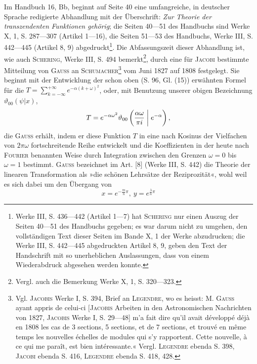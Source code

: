 \par
Im Handbuch 16, Bb, beginnt auf Seite 40 eine umfangreiche, in deutscher
Sprache redigierte Abhandlung mit der Überschrift: \textit{Zur Theorie der
transzendenten Funktionen gehörig}; die Seiten 40—51 des Handbuchs sind Werke
X, 1, S. 287—307 (Artikel 1—16), die Seiten 51—53 des Handbuchs, Werke
III, S. 442—445 (Artikel 8, 9) abgedruckt\footnote{Werke III, S. 436—442 (Artikel 1—7) hat \textsc{Schering} nur einen Auszug der Seiten 40—51 des Handbuchs gegeben; es war darum nicht zu umgehen, den vollständigen Text dieser Seiten im Bande X, 1 der Werke abzudrucken; die Werke III, S. 442—445 abgedruckten Artikel 8, 9, geben den Text der Handschrift mit so unerheblichen Auslassungen, dass von einem Wiederabdruck abgesehen werden konnte.}. Die Abfassungszeit dieser Abhandlung
ist, wie auch \textsc{Schering}, Werke III, S. 494 bemerkt\footnote{Vergl. auch die Bemerkung Werke X, 1, S. 320—323.}, durch eine
für \textsc{Jacobi} bestimmte Mitteilung von \textsc{Gauss} an \textsc{Schumacher}\footnote{Vgl. \textsc{Jacobis} Werke I, S. 394, Brief an \textsc{Legendre}, wo es heisst: M. \textsc{Gauss} ayant appris de celui-ci [\textsc{Jacobis} Arbeiten in den Astronomischen Nachrichten von 1827, \textsc{Jacobis} Werke I, S. 29—48] m’a fait dire qu’il avait développé déjà en 1808 les cas de 3 sections, 5 sections, et de 7 sections, et trouvé en même temps les nouvelles échelles de modules qui s’y rapportent. Cette nouvelle, à ce qui me paraît, est bien intéressante.« Vergl. \textsc{Legendre} ebenda S. 398, \textsc{Jacobi} ebenda S. 416, \textsc{Legendre} ebenda S. 418, 428.} vom Juni 1827
auf 1808 festgelegt. Sie beginnt mit der Entwicklung der schon oben (S. 96,
Gl. (15)) erwähnten Formel für die  \(\displaystyle T=\sum_{k=-\infty}^{+\infty}e^{-\alpha(k+\omega)^2}\),
oder, mit Benutzung unserer obigen Bezeichnung \(\vartheta_{00}(\psi|x)\),
\[
T=e^{-\alpha\omega^2}\vartheta_{00}\left(\frac{\alpha\omega}{\pi i}\biggm|e^{-\alpha}\right),
\]
die \textsc{Gauss} erhält, indem er diese Funktion \(T\) in eine nach Kosinus der Vielfachen
von \(2\pi\omega\) fortschreitende Reihe entwickelt und die Koeffizienten in
der heute nach \textsc{Fourier} benannten Weise durch Integration zwischen den
Grenzen \(\omega=0\) bis \(\omega=1\) bestimmt. \textsc{Gauss} bezeichnet im Art. [8] (Werke
III, S. 442) die Theorie der linearen Transformation als »die schönen Lehrsätze
der Reziprozität«, wohl weil es sich dabei um den Übergang von
\[
x=e^{-\frac{m}{n}\pi},\ y=e^{\frac{\lambda}{n}\pi}
\]
